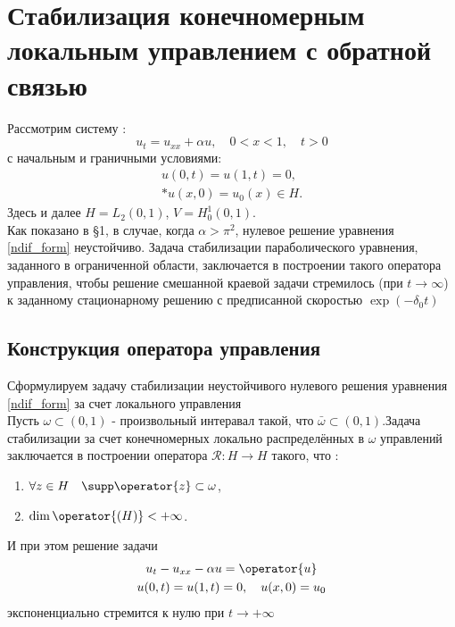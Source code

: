 % 
\section{Стабилизация конечномерным локальным управлением с обратной связью}
Рассмотрим систему :
\begin{equation}\label{ndif_form}
u_t = u_{xx} + \alpha u, \quad 0 < x < 1, \quad t > 0
\end{equation}
с начальным и граничными условиями:
\begin{gather}
u(0, t) = u(1, t) = 0, \\*
u(x, 0) = u_{0}(x) \in H .\nonumber
\end{gather}
Здесь и далее $H = L_2(0, 1)$, $V = H^1_0(0, 1)$.\\
Как показано в \S 1, в случае, когда $\alpha > \pi^2$, нулевое решение уравнения \eqref{ndif_form} неустойчиво.
Задача стабилизации параболического уравнения, заданного в ограниченной области, заключается в построении такого оператора управления, чтобы решение смешанной краевой задачи стремилось (при $t \rightarrow \infty$) к заданному стационарному решению с предписанной скоростью $\exp (-\delta_0t)$

\subsection{Конструкция оператора управления}
Сформулируем задачу стабилизации неустойчивого нулевого решения уравнения \eqref{ndif_form} за счет локального управления\\

Пусть $\omega \subset (0, 1)$ - произвольный интеравал такой, что $\bar{\omega} \subset (0, 1)$.Задача стабилизации за счет конечномерных локально распределённых в $\omega$ управлений заключается в построении оператора $\mathcal{R} : H \rightarrow H$ такого, что :
\begin{enumerate}
\item $\forall z \in H \quad \supp \operator{z} \subset \omega$,
\item $\dim \operator{(H)} < +\infty$.
\end{enumerate}
И при этом решение задачи
\begin{gather}
u_t - u_{xx} - \alpha u = \operator{u} \nonumber\\
u(0, t) = u(1, t) = 0, \quad u(x, 0) = u_0 \nonumber
\end{gather}
экспоненциально стремится к нулю при $t \rightarrow + \infty$\\

